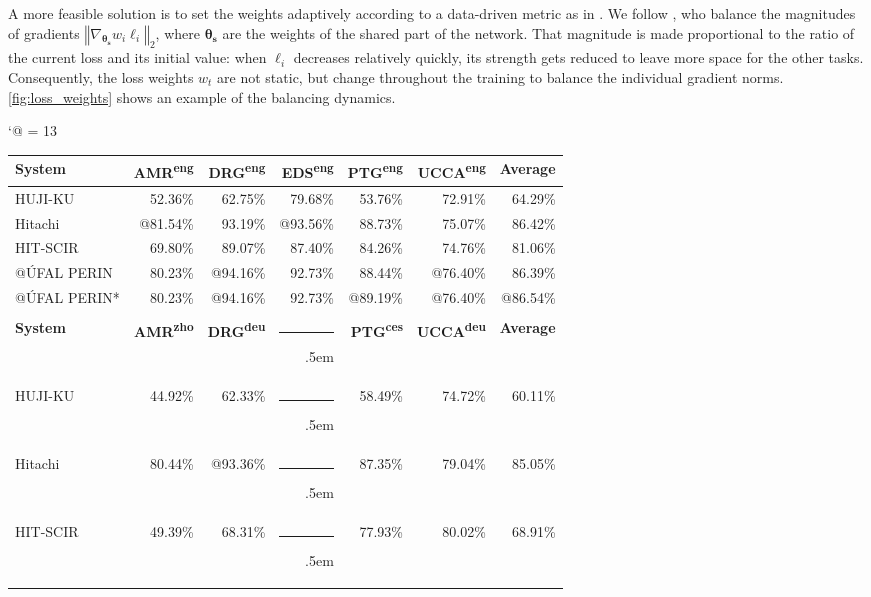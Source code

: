 \documentclass[11pt,a4paper]{article}
\begin{document}
A more feasible solution is to set the weights adaptively according to a data-driven metric as in \citet{kendall2018multi}. We follow \citet{chen2018gradnorm}, who balance the magnitudes of gradients $\left\Vert \nabla_{\bm{\theta_s}} w_i\ell_i \right\Vert_2$, where $\bm{\theta_s}$ are the weights of the shared part of the network. That magnitude is made proportional to the ratio of the current loss and its initial value: when $\ell_i$ decreases relatively quickly, its strength gets reduced to leave more space for the other tasks. Consequently, the loss weights $w_t$ are not static, but change throughout the training to balance the individual gradient norms. \autoref{fig:loss_weights} shows an example of the balancing dynamics.
 \begin{table*}[t]
\small
\centering
\def\-{\rule[.5ex]{2em}{0.5pt}\kern.5em}
\def\={\rule[.5ex]{2em}{1pt}\kern.5em}
\catcode`@ = 13
\begin{tabular}{@{}lrrrrrr@{}}
\toprule
\textbf{System} & \textbf{AMR\textsuperscript{eng}} & \textbf{DRG\textsuperscript{eng}} & \textbf{EDS\textsuperscript{eng}} & \textbf{PTG\textsuperscript{eng}} & \textbf{UCCA\textsuperscript{eng}} & \textbf{Average} \\ \midrule
HUJI-KU \cite{Arv:Cui:Her:20} & 52.36\% & 62.75\% & 79.68\% & 53.76\% & 72.91\% & 64.29\% \\
Hitachi \cite{Oza:Mor:Kor:20} &@81.54\% & 93.19\% &@93.56\% & 88.73\% & 75.07\% & 86.42\% \\
HIT-SCIR \cite{Dou:Fen:Ji:20} & 69.80\% & 89.07\% & 87.40\% & 84.26\% & 74.76\% & 81.06\% \\
@ÚFAL PERIN   & 80.23\% &@94.16\% & 92.73\% & 88.44\% &@76.40\% & 86.39\% \\
@ÚFAL PERIN*  & 80.23\% &@94.16\% & 92.73\% &@89.19\% &@76.40\% &@86.54\% \\ \midrule
 &  &  &  &  &  &  \\ \midrule[1pt]
\textbf{System} & \textbf{AMR\textsuperscript{zho}} & \textbf{DRG\textsuperscript{deu}} & \= & \textbf{PTG\textsuperscript{ces}} & \textbf{UCCA\textsuperscript{deu}} & \textbf{Average} \\ \midrule
HUJI-KU \cite{Arv:Cui:Her:20} & 44.92\% & 62.33\% & \- & 58.49\% & 74.72\% & 60.11\% \\
Hitachi \cite{Oza:Mor:Kor:20} & 80.44\% &@93.36\% & \- & 87.35\% & 79.04\% & 85.05\% \\
HIT-SCIR \cite{Dou:Fen:Ji:20} & 49.39\% & 68.31\% & \- & 77.93\% & 80.02\% & 68.91\% \\

\end{tabular}
\end{table*}
\end{document}
